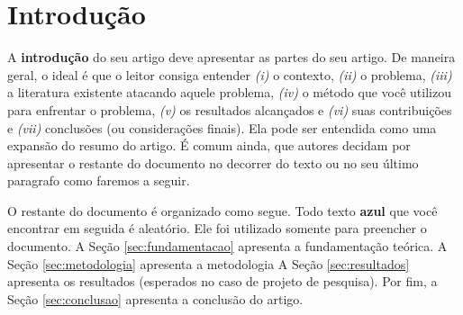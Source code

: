 \section{Introdução}
\label{sec:intro}

A \textbf{introdução} do seu artigo deve apresentar as partes do seu artigo. De maneira geral, o ideal é que o leitor consiga entender \textit{(i)} o contexto, \textit{(ii)} o problema, \textit{(iii)} a literatura existente atacando aquele problema, \textit{(iv)} o método que você utilizou para enfrentar o problema, \textit{(v)} os resultados alcançados e \textit{(vi)} suas contribuições e \textit{(vii)} conclusões (ou considerações finais). Ela pode ser entendida como uma expansão do resumo do artigo. É comum ainda, que autores decidam por apresentar o restante do documento no decorrer do texto ou no seu último paragrafo como faremos a seguir.

O restante do documento é organizado como segue. {\color{blue} Todo texto \textbf{azul} que você encontrar em seguida é aleatório. Ele foi utilizado somente para preencher o documento.}
A Seção \ref{sec:fundamentacao} apresenta a fundamentação teórica. 
A Seção \ref{sec:metodologia} apresenta a metodologia
A Seção \ref{sec:resultados} apresenta os resultados (esperados no caso de projeto de pesquisa). 
Por fim, a Seção \ref{sec:conclusao} apresenta a conclusão do artigo.